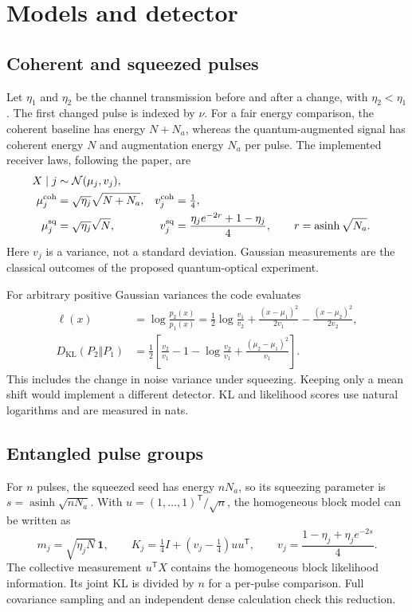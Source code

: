 \documentclass[11pt,a4paper]{article}
\newcommand{\KL}{D_{\mathrm{KL}}}
\begin{document}
\section{Models and detector}
\subsection{Coherent and squeezed pulses}
Let $\eta_1$ and $\eta_2$ be the channel transmission before and after a change,
with $\eta_2<\eta_1$. The first changed pulse is indexed by $\nu$.
For a fair energy comparison, the coherent baseline has energy $N+N_a$,
whereas the quantum-augmented signal has coherent energy $N$ and augmentation
energy $N_a$ per pulse. The implemented receiver laws, following the paper, are
\begin{align}
X\mid j&\sim\mathcal N(\mu_j,v_j),\\
\mu_j^{\rm coh}&=\sqrt{\eta_j}\sqrt{N+N_a},
&v_j^{\rm coh}&=\tfrac14,\\
\mu_j^{\rm sq}&=\sqrt{\eta_j}\sqrt N,
&v_j^{\rm sq}&=\frac{\eta_j e^{-2r}+1-\eta_j}{4},
\qquad r=\operatorname{asinh}\sqrt{N_a}.
\end{align}
Here $v_j$ is a variance, not a standard deviation. Gaussian measurements are
the classical outcomes of the proposed quantum-optical experiment.

For arbitrary positive Gaussian variances the code evaluates
\begin{align}
\ell(x)&=\log\frac{p_2(x)}{p_1(x)}
=\frac12\log\frac{v_1}{v_2}
+\frac{(x-\mu_1)^2}{2v_1}-\frac{(x-\mu_2)^2}{2v_2},\\
\KL(P_2\Vert P_1)
&=\frac12\left[
\frac{v_2}{v_1}-1-\log\frac{v_2}{v_1}
+\frac{(\mu_2-\mu_1)^2}{v_1}\right].
\end{align}
This includes the change in noise variance under squeezing. Keeping only a
mean shift would implement a different detector. KL and likelihood scores
use natural logarithms and are measured in nats.

\subsection{Entangled pulse groups}
For $n$ pulses, the squeezed seed has energy $nN_a$, so its squeezing parameter
is $s=\operatorname{asinh}\sqrt{nN_a}$. With
$u=(1,\ldots,1)^\mathsf T/\sqrt n$, the homogeneous block model can be written as
\begin{equation}
m_j=\sqrt{\eta_j N}\,\mathbf 1,\qquad
K_j=\tfrac14 I+(v_j-\tfrac14)uu^\mathsf T,\qquad
v_j=\frac{1-\eta_j+\eta_j e^{-2s}}4.
\end{equation}
The collective measurement $u^\mathsf TX$ contains the homogeneous block
likelihood information. Its joint KL is divided by $n$ for a per-pulse
comparison. Full covariance sampling and an independent dense calculation
check this reduction.
\end{document}

